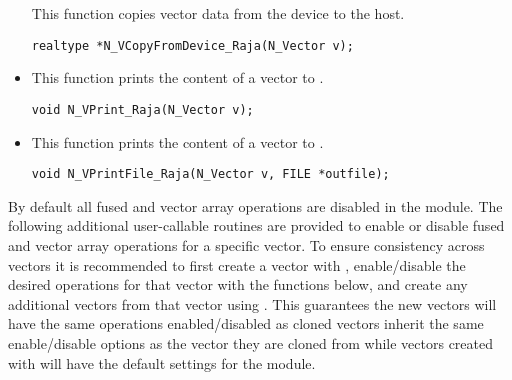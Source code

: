 \begin{itemize}
 This function copies vector data from the device to the host.

 \verb|realtype *N_VCopyFromDevice_Raja(N_Vector v);|



\item {}

  This function prints the content of a {\raja} vector to .

  \verb|void N_VPrint_Raja(N_Vector v);|


\item {}

  This function prints the content of a {\raja} vector to .

  \verb|void N_VPrintFile_Raja(N_Vector v, FILE *outfile);|


\end{itemize}
By default all fused and vector array operations are disabled in the {\nvecraja}
module. The following additional user-callable routines are provided to
enable or disable fused and vector array operations for a specific vector. To
ensure consistency across vectors it is recommended to first create a vector
with , enable/disable the desired operations for that vector
with the functions below, and create any additional vectors from that vector
using . This guarantees the new vectors will have the same
operations enabled/disabled as cloned vectors inherit the same enable/disable
options as the vector they are cloned from while vectors created with
 will have the default settings for the {\nvecraja} module.
